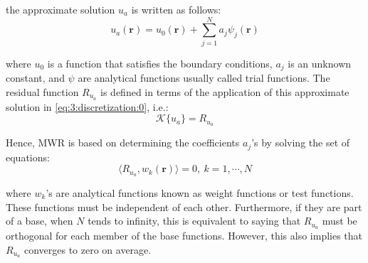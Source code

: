  		\noindent the approximate solution $u_a$ is written as follows:
 		\begin{equation}
 			u_a(\mathbf{r}) = u_0(\mathbf{r}) + \sum\limits_{j=1}^N a_j\psi_j(\mathbf{r}) \label{eq:3:discretization:1}
 		\end{equation}
 	
 		\noindent where $u_0$ is a function that satisfies the boundary conditions, $a_j$ is an unknown constant, and $\psi$ are analytical functions usually called trial functions. The residual function $R_{u_a}$ is defined in terms of the application of this approximate solution in \eqref{eq:3:discretization:0}, i.e.:
 		\begin{equation}
 			\mathcal{K}\{u_a\} = R_{u_a} \label{eq:3:discretization:2}
 		\end{equation}
 	
 		Hence, MWR is based on determining the coefficients $a_j$'s by solving the set of equations:
 		\begin{equation}
 			\langle R_{u_a}, w_k(\mathbf{r}) \rangle = 0,~ k=1,\cdots,N \label{eq:3:discretization:3}
 		\end{equation}
 	
 		\noindent where $w_k$'s are analytical functions known as weight functions or test functions. These functions must be independent of each other. Furthermore, if they are part of a base, when $N$ tends to infinity, this is equivalent to saying that $R_{u_a}$ must be orthogonal for each member of the base functions. However, this also implies that $R_{u_a}$ converges to zero on average.
 		

